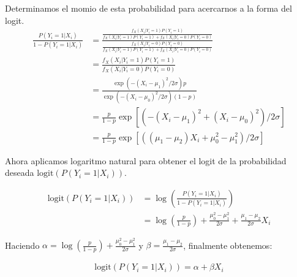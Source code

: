 \documentclass[paper=letter, fontsize=11pt]{scrartcl}\usepackage[]{graphicx}\usepackage[]{xcolor}
\numberwithin{equation}{problemcounter} %
\numberwithin{figure}{problemcounter} %
\numberwithin{table}{problemcounter} %
\numberwithin{subsection}{problemcounter}
\begin{document}
Determinamos el momio de esta probabilidad para acercarnos a la forma del logit.
\begin{align*}
    \frac{P(Y_i=1|X_i)}{1-P(Y_i=1|X_i)} &= \frac{\frac{f_X(X_i|Y_i=1)P(Y_i=1)}{f_X(X_i|Y_i=1)P(Y_i=1) + f_X(X_i|Y_i=0)P(Y_i=0)}}{\frac{f_X(X_i|Y_i=0)P(Y_i=0)}{f_X(X_i|Y_i=1)P(Y_i=1) + f_X(X_i|Y_i=0)P(Y_i=0)}} \\
    &=\frac{f_X(X_i|Y_i=1)P(Y_i=1)}{f_X(X_i|Y_i=0)P(Y_i=0)}\\
    &=\frac{\exp{\left(-(X_i-\mu_1)^2/2\sigma\right)}p}{\exp{\left(-(X_i-\mu_0)^2/2\sigma\right)}(1-p)}\\
    &=\frac{p}{1-p}\exp\left[( -(X_i - \mu_1)^2 + (X_i - \mu_0)^2 )/2\sigma \right]\\
    &=\frac{p}{1-p}\exp\left[( (\mu_1-\mu_2)X_i + \mu_0^2 - \mu_1^2 )/2\sigma \right]
\end{align*}

Ahora aplicamos logaritmo natural para obtener el logit de la probabilidad deseada $\text{logit}\left(P(Y_i=1|X_i)\right)$.

\begin{align*}
    \text{logit}\left(P(Y_i=1|X_i)\right) &= \log\left(\frac{P(Y_i=1|X_i)}{1-P(Y_i=1|X_i)}\right) \\
    &=\log\left(\frac{p}{1-p}\right) + \frac{\mu_0^2 - \mu_1^2}{2\sigma} + \frac{\mu_1-\mu_2}{2\sigma}X_i
\end{align*}

Haciendo $\alpha = \log\left(\frac{p}{1-p}\right) + \frac{\mu_0^2 - \mu_1^2}{2\sigma}$ y $\beta = \frac{\mu_1-\mu_2}{2\sigma}$, finalmente obtenemos:


\begin{align*}
    \text{logit}\left(P(Y_i=1|X_i)\right) = \alpha + \beta X_i
\end{align*}


\newpage
\end{document}
